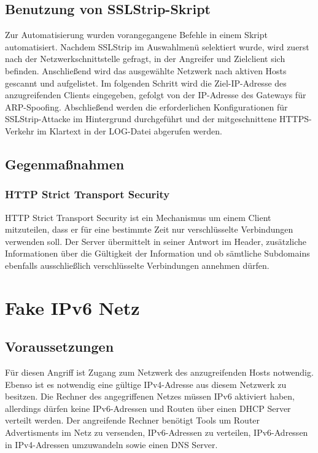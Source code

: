 \subsection*{Benutzung von SSLStrip-Skript}
Zur Automatisierung wurden vorangegangene Befehle in einem Skript automatisiert. Nachdem SSLStrip im Auswahlmenü selektiert wurde, wird zuerst nach der Netzwerkschnittstelle gefragt, in der Angreifer und Zielclient sich befinden. Anschließend wird das ausgewählte Netzwerk nach aktiven Hosts gescannt und aufgelistet. Im folgenden Schritt wird die Ziel-IP-Adresse des anzugreifenden Clients eingegeben, gefolgt von der IP-Adresse des Gateways für ARP-Spoofing. Abschließend werden die erforderlichen Konfigurationen für SSLStrip-Attacke im Hintergrund durchgeführt und der mitgeschnittene HTTPS-Verkehr im Klartext in der LOG-Datei abgerufen werden.
 
 
\subsection*{Gegenmaßnahmen}

\subsubsection*{HTTP Strict Transport Security}
HTTP Strict Transport Security ist ein Mechanismus um einem Client mitzuteilen, dass er für eine bestimmte Zeit nur verschlüsselte Verbindungen verwenden soll. Der Server übermittelt in seiner Antwort im Header, zusätzliche Informationen über die Gültigkeit der Information und ob sämtliche Subdomains ebenfalls ausschließlich verschlüsselte Verbindungen annehmen dürfen. \cite{hsts} \newpage


\section{Fake IPv6 Netz}

\subsection*{Voraussetzungen}
Für diesen Angriff ist Zugang zum Netzwerk des anzugreifenden Hosts notwendig. Ebenso ist es notwendig eine gültige IPv4-Adresse aus diesem Netzwerk zu besitzen. Die Rechner des angegriffenen Netzes müssen IPv6 aktiviert haben, allerdings dürfen keine IPv6-Adressen und Routen über einen DHCP Server verteilt werden.
Der angreifende Rechner benötigt Tools um Router Advertisments im Netz zu versenden, IPv6-Adressen zu verteilen, IPv6-Adressen in IPv4-Adressen umzuwandeln sowie einen DNS Server.

